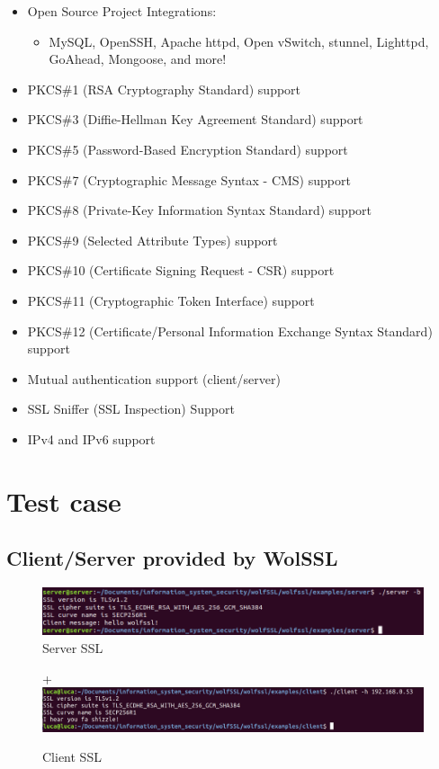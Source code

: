 \documentclass[a4paper,12pt]{report}
\begin{document}
\begin{itemize}
\item Open Source Project Integrations:
\begin{itemize}
\item MySQL, OpenSSH, Apache httpd, Open vSwitch, stunnel, Lighttpd, GoAhead, Mongoose, and more!
\end{itemize}
\item PKCS\#1 (RSA Cryptography Standard) support
\item PKCS\#3 (Diffie-Hellman Key Agreement Standard) support
\item PKCS\#5 (Password-Based Encryption Standard) support
\item PKCS\#7 (Cryptographic Message Syntax - CMS) support
\item PKCS\#8 (Private-Key Information Syntax Standard) support
\item PKCS\#9 (Selected Attribute Types) support
\item PKCS\#10 (Certificate Signing Request - CSR) support
\item PKCS\#11 (Cryptographic Token Interface) support
\item PKCS\#12 (Certificate/Personal Information Exchange Syntax Standard) support
\item Mutual authentication support (client/server)
\item SSL Sniffer (SSL Inspection) Support
\item IPv4 and IPv6 support
\end{itemize}
\chapter{Test case}
\section{Client/Server provided by WolSSL}

\begin{figure}[H]
    \centering
    \includegraphics[scale=0.5]{test/examples/client-server/server.png}
    \caption{Server SSL}
    
\end{figure}

\begin{figure}[H]+
    \centering
    \includegraphics[scale=0.225]{test/examples/client-server/client.png}
    \caption{Client SSL}
    
\end{figure}
\end{document}
